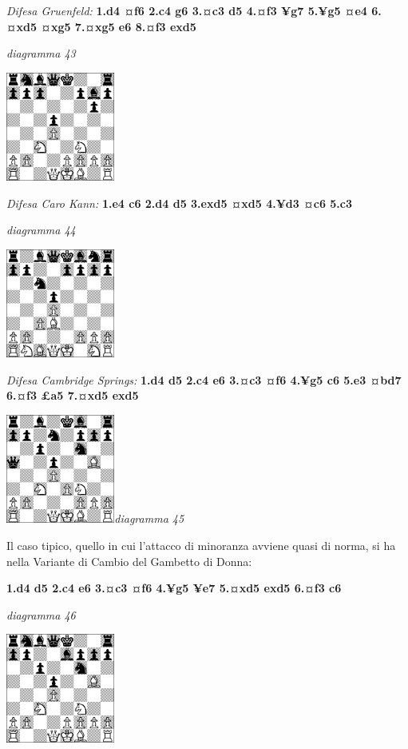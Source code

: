 \documentclass[
]{article}
\begin{document}
\emph{Difesa Gruenfeld:} \textbf{1.d4 ¤f6 2.c4 g6 3.¤c3 d5 4.¤f3 ¥g7
5.¥g5 ¤e4 6.¤xd5 ¤xg5 7.¤xg5 e6 8.¤f3 exd5}

\emph{diagramma 43}

\includegraphics[width=1.40972in,height=1.40972in]{vertopal_109f12be458a423d8f3cc838880eaea2/media/image43.png}

\emph{Difesa Caro Kann:} \textbf{1.e4 c6 2.d4 d5 3.exd5 ¤xd5 4.¥d3 ¤c6
5.c3}

\emph{diagramma 44}

\includegraphics[width=1.40972in,height=1.40972in]{vertopal_109f12be458a423d8f3cc838880eaea2/media/image44.png}

\emph{Difesa Cambridge Springs:} \textbf{1.d4 d5 2.c4 e6 3.¤c3 ¤f6 4.¥g5
c6 5.e3 ¤bd7 6.¤f3 £a5 7.¤xd5 exd5}

\includegraphics[width=1.40972in,height=1.40972in]{vertopal_109f12be458a423d8f3cc838880eaea2/media/image45.png}\emph{diagramma
45}

Il caso tipico, quello in cui l'attacco di minoranza avviene quasi di
norma, si ha nella Variante di Cambio del Gambetto di Donna:

\textbf{1.d4 d5 2.c4 e6 3.¤c3 ¤f6 4.¥g5 ¥e7 5.¤xd5 exd5 6.¤f3 c6}

\emph{diagramma 46}

\includegraphics[width=1.40972in,height=1.40972in]{vertopal_109f12be458a423d8f3cc838880eaea2/media/image46.png}
\end{document}
